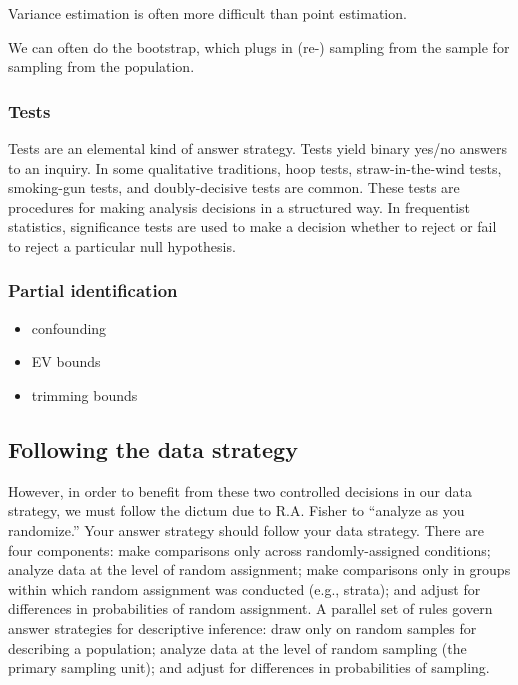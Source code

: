 \documentclass[
]{article}
\providecommand{\tightlist}{%
  \setlength{\itemsep}{0pt}\setlength{\parskip}{0pt}}
\begin{document}
Variance estimation is often more difficult than point estimation.

We can often do the bootstrap, which plugs in (re-) sampling from the
sample for sampling from the population.

\hypertarget{tests}{%
\subsubsection{Tests}\label{tests}}

Tests are an elemental kind of answer strategy. Tests yield binary
yes/no answers to an inquiry. In some qualitative traditions, hoop
tests, straw-in-the-wind tests, smoking-gun tests, and doubly-decisive
tests are common. These tests are procedures for making analysis
decisions in a structured way. In frequentist statistics, significance
tests are used to make a decision whether to reject or fail to reject a
particular null hypothesis.

\hypertarget{partial-identification}{%
\subsubsection{Partial identification}\label{partial-identification}}

\begin{itemize}
\tightlist
\item
  confounding
\item
  EV bounds
\item
  trimming bounds
\end{itemize}

\hypertarget{p2followdatastrategy}{%
\subsection{Following the data strategy}\label{p2followdatastrategy}}

However, in order to benefit from these two controlled decisions in our
data strategy, we must follow the dictum due to R.A. Fisher to ``analyze
as you randomize.'' Your answer strategy should follow your data
strategy. There are four components: make comparisons only across
randomly-assigned conditions; analyze data at the level of random
assignment; make comparisons only in groups within which random
assignment was conducted (e.g., strata); and adjust for differences in
probabilities of random assignment. A parallel set of rules govern
answer strategies for descriptive inference: draw only on random samples
for describing a population; analyze data at the level of random
sampling (the primary sampling unit); and adjust for differences in
probabilities of sampling.
\end{document}
